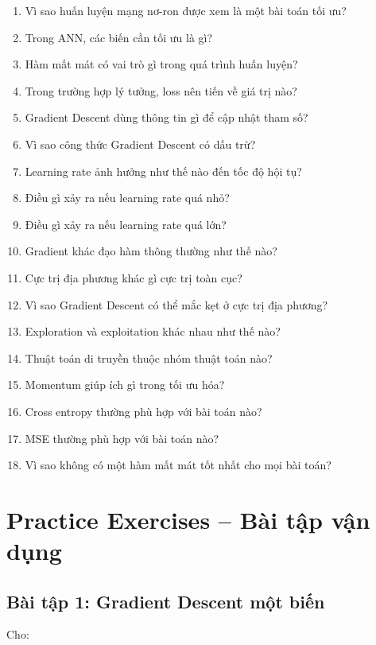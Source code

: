 \begin{enumerate}
    \item Vì sao huấn luyện mạng nơ-ron được xem là một bài toán tối ưu?
    \item Trong ANN, các biến cần tối ưu là gì?
    \item Hàm mất mát có vai trò gì trong quá trình huấn luyện?
    \item Trong trường hợp lý tưởng, loss nên tiến về giá trị nào?
    \item Gradient Descent dùng thông tin gì để cập nhật tham số?
    \item Vì sao công thức Gradient Descent có dấu trừ?
    \item Learning rate ảnh hưởng như thế nào đến tốc độ hội tụ?
    \item Điều gì xảy ra nếu learning rate quá nhỏ?
    \item Điều gì xảy ra nếu learning rate quá lớn?
    \item Gradient khác đạo hàm thông thường như thế nào?
    \item Cực trị địa phương khác gì cực trị toàn cục?
    \item Vì sao Gradient Descent có thể mắc kẹt ở cực trị địa phương?
    \item Exploration và exploitation khác nhau như thế nào?
    \item Thuật toán di truyền thuộc nhóm thuật toán nào?
    \item Momentum giúp ích gì trong tối ưu hóa?
    \item Cross entropy thường phù hợp với bài toán nào?
    \item MSE thường phù hợp với bài toán nào?
    \item Vì sao không có một hàm mất mát tốt nhất cho mọi bài toán?
\end{enumerate}

\section{Practice Exercises -- Bài tập vận dụng}

\subsection*{Bài tập 1: Gradient Descent một biến}

Cho:

